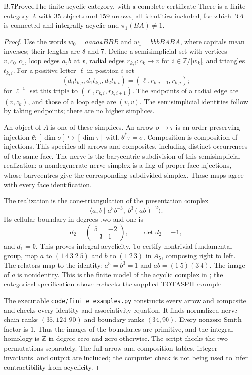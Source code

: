 \begin{claim}{B.7}{Proved}{The finite acyclic category, with a complete certificate}
There is a finite category $A$ with $35$ objects and $159$ arrows, all identities included, for which $BA$ is connected and integrally acyclic and $\pi_1(BA)\ne1$.
\end{claim}
\begin{proof}
Use the words $w_0=aaaaaBBB$ and $w_1=bbbBABA$, where capitals mean inverses; their lengths are $8$ and $7$. Define a semisimplicial set with vertices $v,c_0,c_1$, loop edges $a,b$ at $v$, radial edges $r_{k,i}:c_k\to v$ for $i\in\mathbb Z/|w_k|$, and triangles $t_{k,i}$. For a positive letter $\ell$ in position $i$ set
\[
 (d_0t_{k,i},d_1t_{k,i},d_2t_{k,i})=(\ell,r_{k,i+1},r_{k,i});
\]
for $\ell^{-1}$ set this triple to $(\ell,r_{k,i},r_{k,i+1})$. The endpoints of a radial edge are $(v,c_k)$, and those of a loop edge are $(v,v)$. The semisimplicial identities follow by taking endpoints; there are no higher simplices.

An object of $A$ is one of these simplices. An arrow $\sigma\to\tau$ is an order-preserving injection $\theta:[\dim\sigma]\hookrightarrow[\dim\tau]$ with $\theta^*\tau=\sigma$. Composition is composition of injections. This specifies all arrows and composites, including distinct occurrences of the same face. The nerve is the barycentric subdivision of this semisimplicial realization: a nondegenerate nerve simplex is a flag of proper face injections, whose barycentres give the corresponding subdivided simplex. These maps agree with every face identification.

The realization is the cone-triangulation of the presentation complex
\[
 \langle a,b\mid a^5b^{-3},\ b^3(ab)^{-2}\rangle.
\]
Its cellular boundary in degrees two and one is
\[
 d_2=\begin{pmatrix}5&-2\\-3&1\end{pmatrix},\qquad \det d_2=-1,
\]
and $d_1=0$. This proves integral acyclicity. To certify nontrivial fundamental group, map $a$ to $(1\ 4\ 3\ 2\ 5)$ and $b$ to $(1\ 2\ 3)$ in $A_5$, composing right to left. The relators map to the identity: $a^5=b^3=1$ and $ab=(1\ 5)(3\ 4)$. The image of $a$ is nonidentity. This is the finite model of the acyclic complex in \citet[Example 2.38, p.~142]{RootHatcher2002}; the categorical specification above rechecks the supplied TOTASPH example.

The executable \texttt{code/finite\_examples.py} constructs every arrow and composite and checks every identity and associativity equation. It finds normalized nerve-chain ranks $(35,124,90)$ and boundary ranks $(34,90)$. Every nonzero Smith factor is $1$. Thus the images of the boundaries are primitive, and the integral homology is $\mathbb Z$ in degree zero and zero otherwise. The script checks the two permutations separately. The full arrow and composition tables, integer invariants, and output are included; the computer check is not being used to infer contractibility from acyclicity.
\end{proof}

